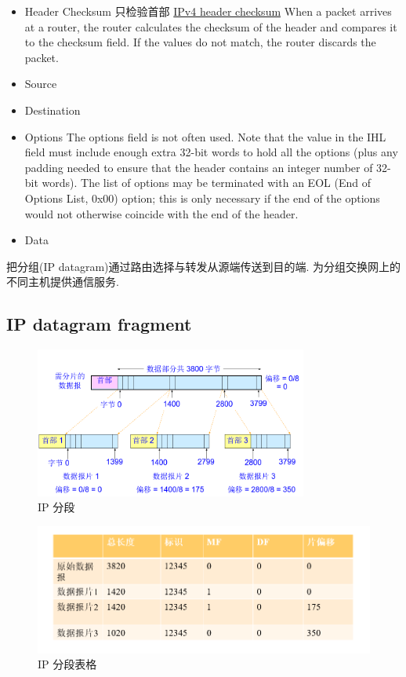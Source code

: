 \documentclass[a4paper]{report}
\begin{document}
\begin{itemize}
  \item Header Checksum
  \subitem 只检验首部
  \subitem \href{https://en.wikipedia.org/wiki/IPv4_header_checksum}{IPv4 header checksum} When a packet arrives at a router, the router calculates the checksum of the header and compares it to the checksum field. If the values do not match, the router discards the packet.
  \item Source
  \item Destination
  \item Options
  \subitem The options field is not often used. Note that the value in the IHL field must include enough extra 32-bit words to hold all the options (plus any padding needed to ensure that the header contains an integer number of 32-bit words). 
  \subitem The list of options may be terminated with an EOL (End of Options List, 0x00) option; this is only necessary if the end of the options would not otherwise coincide with the end of the header. 
  \item Data 
\end{itemize}

把分组(IP datagram)通过路由选择与转发从源端传送到目的端. 为分组交换网上的不同主机提供通信服务. 

\subsection{IP datagram fragment}
\begin{figure}[H]
\centering
\includegraphics[width=0.8\textwidth]{ip_frag.png}
\caption{IP 分段}
\end{figure}

\begin{figure}[H]
\centering
\includegraphics[width=\textwidth]{ip_frag_tab.png}
\caption{IP 分段表格}
\end{figure}
\end{document}
